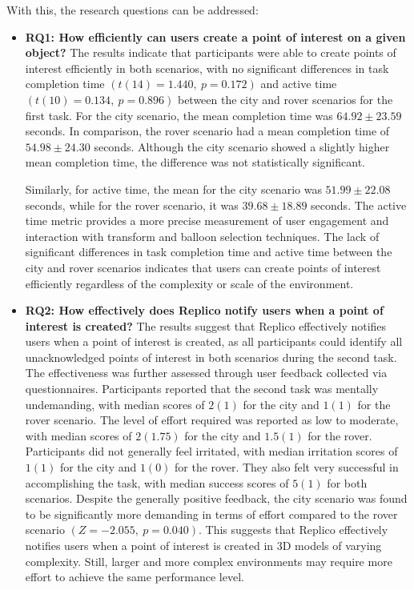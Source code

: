         With this, the research questions can be addressed:

        \begin{itemize}
            \item \textbf{RQ1: How efficiently can users create a point of interest on a given object?} The results indicate that participants were able to create points of interest efficiently in both scenarios, with no significant differences in task completion time $\left(t(14) = 1.440,\ p = 0.172\right)$ and active time $\left(t(10) = 0.134,\ p = 0.896\right)$ between the city and rover scenarios for the first task. For the city scenario, the mean completion time was $64.92 \pm 23.59$ seconds. In comparison, the rover scenario had a mean completion time of $54.98 \pm 24.30$ seconds. Although the city scenario showed a slightly higher mean completion time, the difference was not statistically significant. 

            Similarly, for active time, the mean for the city scenario was $51.99 \pm 22.08$ seconds, while for the rover scenario, it was $39.68 \pm 18.89$ seconds. The active time metric provides a more precise measurement of user engagement and interaction with transform and balloon selection techniques. The lack of significant differences in task completion time and active time between the city and rover scenarios indicates that users can create points of interest efficiently regardless of the complexity or scale of the environment.

            \item \textbf{RQ2: How effectively does Replico notify users when a point of interest is created?} The results suggest that Replico effectively notifies users when a point of interest is created, as all participants could identify all unacknowledged points of interest in both scenarios during the second task. The effectiveness was further assessed through user feedback collected via questionnaires. Participants reported that the second task was mentally undemanding, with median scores of $2 (1)$ for the city and $1 (1)$ for the rover scenario. The level of effort required was reported as low to moderate, with median scores of $2 (1.75)$ for the city and $1.5 (1)$ for the rover. Participants did not generally feel irritated, with median irritation scores of $1 (1)$ for the city and $1 (0)$ for the rover. They also felt very successful in accomplishing the task, with median success scores of $5 (1)$ for both scenarios. Despite the generally positive feedback, the city scenario was found to be significantly more demanding in terms of effort compared to the rover scenario $\left(Z = -2.055,\ p = 0.040\right)$. This suggests that Replico effectively notifies users when a point of interest is created in 3D models of varying complexity. Still, larger and more complex environments may require more effort to achieve the same performance level.


\end{itemize}
